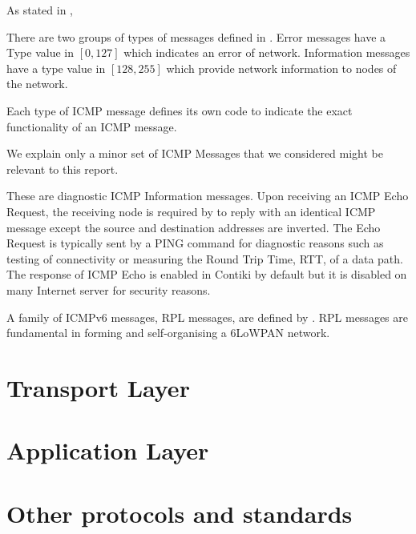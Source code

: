 As stated in \cite{rfc4443},
\begin{description}[style=nextline]
\item[\textbf{Type}]
There are two groups of types of messages defined in \cite{rfc4443}. Error messages have a Type value in $[0,127]$ which indicates an error of network. Information messages have a type value in $[128,255]$ which provide network information to nodes of the network.
\item[\textbf{Code}]
Each type of ICMP message defines its own code to indicate the exact functionality of an ICMP message.
\item[\textbf{Checksum}]
\end{description}

We explain only a minor set of ICMP Messages that we considered might be relevant to this report.
\begin{description}[style=nextline]
\item[\textbf{Echo Request and Reply Messages}]
These are diagnostic ICMP Information messages. Upon receiving an ICMP Echo Request, the receiving node is required by \cite{rfc4443} to reply with an identical ICMP message except the source and destination addresses are inverted. The Echo Request is typically sent by a PING command for diagnostic reasons such as testing of connectivity or measuring the Round Trip Time, RTT, of a data path. The response of ICMP Echo is enabled in Contiki by default but it is disabled on many Internet server for security reasons.
\end{description}

A family of ICMPv6 messages, RPL messages, are defined by \cite{rfc6550}. RPL messages are fundamental in forming and self-organising a 6LoWPAN network. 


\section{Transport Layer} \label{Sec: Transportation Layer}

\section{Application Layer}

\section{Other protocols and standards}
